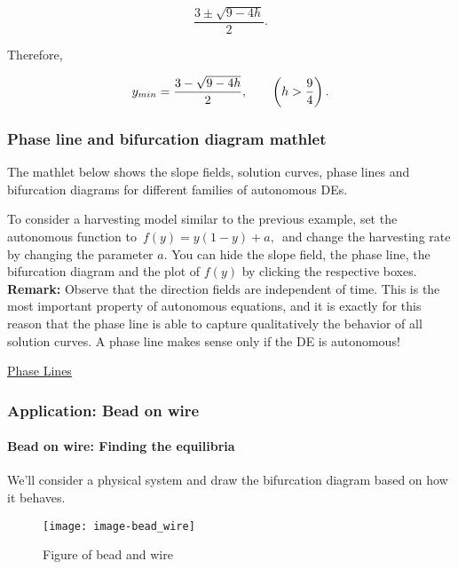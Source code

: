 \begin{equation*}
  \displaystyle  \frac{3 \pm \sqrt {9 - 4h}}{2}.
\end{equation*}

Therefore,

\begin{equation*}
  \displaystyle \displaystyle y_{min}
  \displaystyle =
  \displaystyle  \frac{3 - \sqrt {9 - 4h}}{2}, \qquad \left(h>\frac{9}{4}\right).  
\end{equation*}

\clearpage

\subsubsection{Phase line and bifurcation diagram mathlet}

The mathlet below shows the slope fields, solution curves,
phase lines and bifurcation diagrams for different families of autonomous DEs.

To consider a harvesting model similar to the previous example,
set the autonomous function to $\, f(y) = y(1 - y) + a,\,$
and change the harvesting rate by changing the parameter $a$.
You can hide the slope field, the phase line, the bifurcation diagram
and the plot of $f(y)$ by clicking the respective boxes.\\

\textbf{Remark:}
Observe that the direction fields are independent of time.
This is the most important property of autonomous equations,
and it is exactly for this reason that the phase line is able to capture
qualitatively the behavior of all solution curves.
A phase line makes sense only if the DE is autonomous!

\href{http://mathlets.org/mathlets/phase-lines/}
{Phase Lines}

\clearpage

\subsubsection{Application: Bead on wire}

\paragraph{Bead on wire: Finding the equilibria}
We'll consider a physical system
and draw the bifurcation diagram based on how it behaves.

\begin{wrapfigure}{r}{5.5cm}
  \texttt{[image: image-bead\_wire]}
  \caption{Figure of bead and wire}
\end{wrapfigure}

